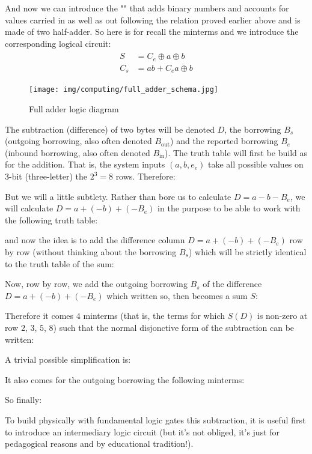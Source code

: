 	And now we can introduce the "" that adds binary numbers and accounts for values carried in as well as out following the relation proved earlier above and is made of two half-adder. So here is for recall the minterms and we introduce the corresponding logical circuit:
	\begin{gather*}
		\begin{aligned}
		S&=C_e\oplus a\oplus b\\
		C_s&=ab+C_ea\oplus b
		\end{aligned}
	\end{gather*}
	\begin{figure}[H]
		\centering
		\texttt{[image: img/computing/full\_adder\_schema.jpg]}
		\caption{Full adder logic diagram}
	\end{figure}
	
	
	\pagebreak
	The subtraction (difference) of two bytes will be denoted $D$, the borrowing $B_s$ (outgoing borrowing, also often denoted $B_\text{out}$) and the reported borrowing $B_e$ (inbound borrowing, also often denoted $B_\text{in}$). The truth table will first be build as for the addition. That is, the system inputs $(a,b,e_e)$ take all possible values on $3$-bit (three-letter) the $2^3=8$ rows. Therefore:
	
	But we will a little subtlety. Rather than bore us to calculate $D=a-b-B_e$, we will calculate $D=a+(-b)+(-B_e)$ in the purpose to be able to work with the following truth table:
	
	and now the idea is to add the difference column $D=a+(-b)+(-B_e)$ row by row (without thinking about the borrowing $B_s$) which will be strictly identical to the truth table of the sum:
	
	Now, row by row, we add the outgoing borrowing $B_s$ of the difference $D=a+(-b)+(-B_e)$ which written so, then becomes a sum $S$:
	
	Therefore it comes $4$ minterms (that is, the terms for which $S(D)$ is non-zero at row $2$, $3$, $5$, $8$) such that the normal disjonctive form of the subtraction can be written:
	
	A trivial possible simplification is:
	
	It also comes for the outgoing borrowing the following minterms:
	
	So finally:
	
	To build physically with fundamental logic gates this subtraction, it is useful first to introduce an intermediary logic circuit (but it's not obliged, it's just for pedagogical reasons and by educational tradition!). 
	
